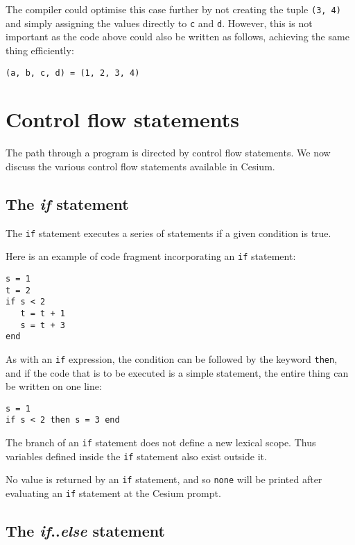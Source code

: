 \documentclass[a4paper,10pt]{article}
\newcommand{\code}{\lstinline}
\begin{document}
{The compiler could optimise this case further by not creating the tuple \code{(3, 4)} and simply
assigning the values directly to \code{c} and \code{d}. However, this is not important as the
code above could also be written as follows, achieving the same thing efficiently:

\begin{lstlisting}
(a, b, c, d) = (1, 2, 3, 4)
\end{lstlisting}

\section{Control flow statements}

The path through a program is directed by control flow statements. We now discuss the various 
control flow statements available in Cesium.

\subsection{The \textit{if} statement}

The \code{if} statement executes a series of statements if a given condition is true.

Here is an example of code fragment incorporating an \code{if} statement:

\begin{lstlisting}
s = 1
t = 2
if s < 2
   t = t + 1
   s = t + 3
end
\end{lstlisting}

As with an \code{if} expression, the condition can be followed by the keyword \code{then}, and if 
the code that is to be executed is a simple statement, the entire thing can be written on one line:

\begin{lstlisting}
s = 1
if s < 2 then s = 3 end
\end{lstlisting}

The branch of an \code{if} statement does not define a new lexical scope. Thus variables defined 
inside the \code{if} statement also exist outside it.

No value is returned by an \code{if} statement, and so \code{none} will be printed after
evaluating an \code{if} statement at the Cesium prompt.

\subsection{The \textit{if}..\textit{else} statement}

}
\end{document}
